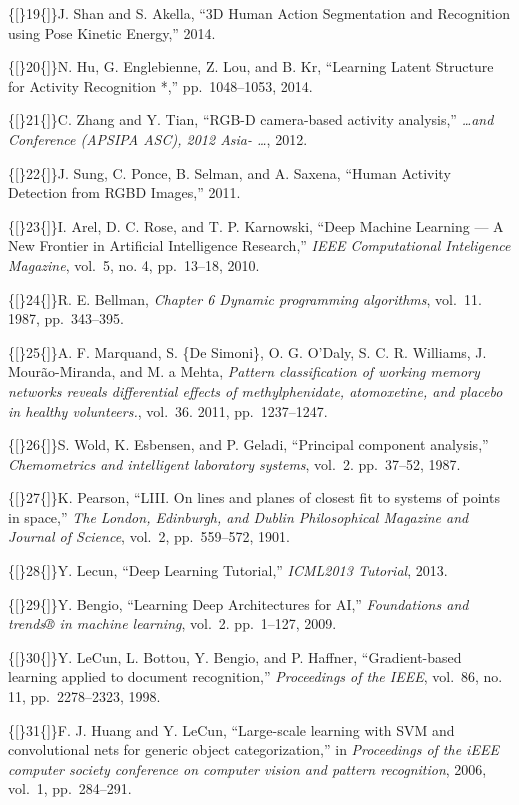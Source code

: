 \{{[}\}19\{{]}\}J. Shan and S. Akella, ``3D Human Action Segmentation
and Recognition using Pose Kinetic Energy,'' 2014.

\{{[}\}20\{{]}\}N. Hu, G. Englebienne, Z. Lou, and B. Kr, ``Learning
Latent Structure for Activity Recognition *,'' pp.~1048--1053, 2014.

\{{[}\}21\{{]}\}C. Zhang and Y. Tian, ``RGB-D camera-based activity
analysis,''
\emph{\ldots{}and Conference (APSIPA ASC), 2012 Asia- \ldots{}}, 2012.

\{{[}\}22\{{]}\}J. Sung, C. Ponce, B. Selman, and A. Saxena, ``Human
Activity Detection from RGBD Images,'' 2011.

\{{[}\}23\{{]}\}I. Arel, D. C. Rose, and T. P. Karnowski, ``Deep Machine
Learning --- A New Frontier in Artificial Intelligence Research,''
\emph{IEEE Computational Inteligence Magazine}, vol.~5, no. 4,
pp.~13--18, 2010.

\{{[}\}24\{{]}\}R. E. Bellman,
\emph{Chapter 6 Dynamic programming algorithms}, vol.~11. 1987,
pp.~343--395.

\{{[}\}25\{{]}\}A. F. Marquand, S. \{De Simoni\}, O. G. O'Daly, S. C. R.
Williams, J. Mourão-Miranda, and M. a Mehta,
\emph{Pattern classification of
working memory networks reveals differential effects of methylphenidate,
atomoxetine, and placebo in healthy volunteers.}, vol.~36. 2011,
pp.~1237--1247.

\{{[}\}26\{{]}\}S. Wold, K. Esbensen, and P. Geladi, ``Principal
component analysis,''
\emph{Chemometrics and intelligent laboratory systems}, vol.~2.
pp.~37--52, 1987.

\{{[}\}27\{{]}\}K. Pearson, ``LIII. On lines and planes of closest fit
to systems of points in space,'' \emph{The London, Edinburgh, and Dublin
Philosophical Magazine and Journal of Science}, vol.~2, pp.~559--572,
1901.

\{{[}\}28\{{]}\}Y. Lecun, ``Deep Learning Tutorial,''
\emph{ICML2013 Tutorial}, 2013.

\{{[}\}29\{{]}\}Y. Bengio, ``Learning Deep Architectures for AI,''
\emph{Foundations and trends® in machine learning}, vol.~2. pp.~1--127,
2009.

\{{[}\}30\{{]}\}Y. LeCun, L. Bottou, Y. Bengio, and P. Haffner,
``Gradient-based learning applied to document recognition,''
\emph{Proceedings of the
IEEE}, vol.~86, no. 11, pp.~2278--2323, 1998.

\{{[}\}31\{{]}\}F. J. Huang and Y. LeCun, ``Large-scale learning with
SVM and convolutional nets for generic object categorization,'' in
\emph{Proceedings of the iEEE computer society conference on computer
vision and pattern recognition}, 2006, vol.~1, pp.~284--291.

